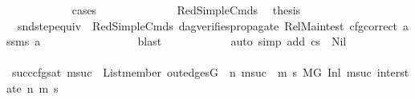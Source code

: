 \begin{isabellebody}
\ \ \ \ \ \ \ \ \ \ \isamarkupfalse%
\ cases\isanewline
\ \ \ \ \ \ \ \ \ \ \ \ \isamarkupfalse%
\ RedSimpleCmds\ \isamarkupfalse%
\ {\isacharquery}{\kern0pt}thesis\ \isanewline
\ \ \ \ \ \ \ \ \ \ \ \ \ \ \isamarkupfalse%
\ {}\ snd{\isacharunderscore}{\kern0pt}step{\isacharunderscore}{\kern0pt}equiv\ \ RedSimpleCmds{\isacharparenleft}{\kern0pt}{}{\isacharparenright}{\kern0pt}\ dag{\isacharunderscore}{\kern0pt}verifies{\isacharunderscore}{\kern0pt}propagate\ Rel{\isacharunderscore}{\kern0pt}Main{\isacharunderscore}{\kern0pt}test{\isacharparenleft}{\kern0pt}{}{\isacharparenright}{\kern0pt}\ cfg{\isacharunderscore}{\kern0pt}correct\ assms{\isacharparenleft}{\kern0pt}{}{\isacharminus}{\kern0pt}{}{\isacharparenright}{\kern0pt}\ a{}\ \isanewline
\ \ \ \ \ \ \ \ \ \ \ \ \ \ \isamarkupfalse%
\ blast\isanewline
\ \ \ \ \ \ \ \ \ \ \isamarkupfalse%
\ {\isacharparenleft}{\kern0pt}auto\ simp\ add{\isacharcolon}{\kern0pt}\ {\isacartoucheopen}cs{}\ {\isasymnoteq}\ Nil{\isacartoucheclose}{\isacharparenright}{\kern0pt}\ \isanewline
\isanewline
\ \ \ \ \ \ \ \ \ \ \isamarkupfalse%
\ succ{\isacharunderscore}{\kern0pt}cfg{\isacharunderscore}{\kern0pt}sat{\isacharcolon}{\kern0pt}\ {\isachardoublequoteopen}{\isacharparenleft}{\kern0pt}{\isasymforall}msuc{}{\isachardot}{\kern0pt}\ \ List{\isachardot}{\kern0pt}member\ {\isacharparenleft}{\kern0pt}out{\isacharunderscore}{\kern0pt}edges{\isacharparenleft}{\kern0pt}G{\isacharparenright}{\kern0pt}\ {\isacharbang}{\kern0pt}\ n{\isacharparenright}{\kern0pt}\ msuc{}\ {\isasymlongrightarrow}\ {\isacharparenleft}{\kern0pt}{\isasymforall}m{\isacharprime}{\kern0pt}\ s{\isacharprime}{\kern0pt}{\isachardot}{\kern0pt}\ {\isacharparenleft}{\kern0pt}{\isacharparenleft}{\kern0pt}M{\isacharcomma}{\kern0pt}{\isasymLambda}{\isacharcomma}{\kern0pt}{\isasymGamma}{\isacharcomma}{\kern0pt}{\isasymOmega}{\isacharcomma}{\kern0pt}G\ {\isasymturnstile}{\isacharparenleft}{\kern0pt}Inl\ {\isacharparenleft}{\kern0pt}msuc{}{\isacharparenright}{\kern0pt}{\isacharcomma}{\kern0pt}\ inter{\isacharunderscore}{\kern0pt}state{\isacharparenright}{\kern0pt}\ {\isacharminus}{\kern0pt}n{\isasymrightarrow}{\isacharasterisk}{\kern0pt}\ {\isacharparenleft}{\kern0pt}m{\isacharprime}{\kern0pt}{\isacharcomma}{\kern0pt}\ s{\isacharprime}{\kern0pt}{\isacharparenright}{\kern0pt}{\isacharparenright}{\kern0pt}\ {\isasymlongrightarrow}\isanewline

\end{isabellebody}
